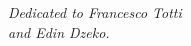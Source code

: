 \newpage\null\thispagestyle{empty}\newpage
\thispagestyle{empty}
\begin{flushright}
\null{}
{\em Dedicated to Francesco Totti} \\
{\em and Edin Dzeko.}
\null
\end{flushright}